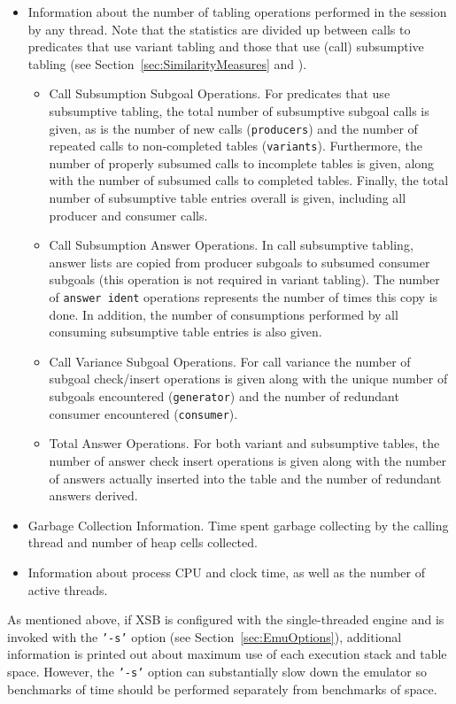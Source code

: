 \begin{description}
\begin{itemize}
\item Information about the number of tabling operations performed in
  the session by any thread.  Note that the statistics are divided up
  between calls to predicates that use variant tabling and those that
  use (call) subsumptive tabling (see
  Section~\ref{sec:SimilarityMeasures} and \cite{TST99}).
\begin{itemize}
\item Call Subsumption Subgoal Operations.  For predicates that use
subsumptive tabling, the total number of subsumptive subgoal calls is
given, as is the number of new calls ({\tt producers}) and the number
of repeated calls to non-completed tables ({\tt variants}).
Furthermore, the number of properly subsumed calls to incomplete
tables is given, along with the number of subsumed calls to completed
tables.  Finally, the total number of subsumptive table entries
overall is given, including all producer and consumer calls.
%
\item Call Subsumption Answer Operations.  In call subsumptive
tabling, answer lists are copied from producer subgoals to subsumed
consumer subgoals (this operation is not required in variant tabling).
The number of {\tt answer ident} operations represents the number of
times this copy is done.  In addition, the number of consumptions
performed by all consuming subsumptive table entries is also given.
%
\item Call Variance Subgoal Operations.  For call variance the number
of subgoal check/insert operations is given along with the unique
number of subgoals encountered ({\tt generator}) and the number of
redundant consumer encountered ({\tt consumer}).
%
\item Total Answer Operations.  For both variant and subsumptive
tables, the number of answer check insert operations is given along
with the number of answers actually inserted into the table and the
number of redundant answers derived.
\end{itemize}
%
\item Garbage Collection Information.  Time spent garbage collecting
  by the calling thread and number of heap cells collected.

\item Information about process CPU and clock time, as well as the
  number of active threads.
    \end{itemize}

As mentioned above, if XSB is configured with the single-threaded
engine and is invoked with the {\tt '-s'} option (see
Section~\ref{sec:EmuOptions}), additional information is printed out
about maximum use of each execution stack and table space.  However,
the {\tt '-s'} option can substantially slow down the emulator so
benchmarks of time should be performed separately from benchmarks of
space.


\end{description}
